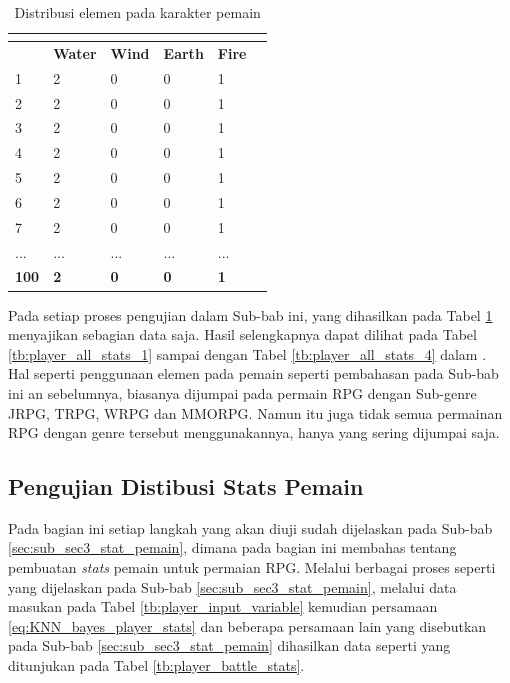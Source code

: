 \begin{longtable}{|l|l|l|l|l|l|}
	\caption{Distribusi elemen pada karakter pemain}
	\vspace{1ex}
	\label{tb:player_element}\\
	\hline
	\rowcolor[HTML]{C0C0C0} 
	\multicolumn{1}{|c|}{\cellcolor[HTML]{C0C0C0}\textbf{Levels}} & \multicolumn{1}{c|}{\cellcolor[HTML]{C0C0C0}\textbf{Water}} & \multicolumn{1}{c|}{\cellcolor[HTML]{C0C0C0}\textbf{Wind}} & \multicolumn{1}{c|}{\cellcolor[HTML]{C0C0C0}\textbf{Earth}} & \multicolumn{1}{c|}{\cellcolor[HTML]{C0C0C0}\textbf{Fire}} \\ \hline
	1 & 2 & 0 & 0 & 1 \\ \hline
	2 & 2 & 0 & 0 & 1 \\ \hline
	3 & 2 & 0 & 0 & 1 \\ \hline
	4 & 2 & 0 & 0 & 1 \\ \hline
	5 & 2 & 0 & 0 & 1 \\ \hline
	6 & 2 & 0 & 0 & 1 \\ \hline
	7 & 2 & 0 & 0 & 1 \\ \hline
	... & ... & ... & ... & ... \\ \hline
	\textbf{100} & \textbf{2} & \textbf{0} & \textbf{0} & \textbf{1} \\ \hline
\end{longtable}

Pada setiap proses pengujian dalam Sub-bab ini, yang dihasilkan pada Tabel \ref{tb:player_element} menyajikan sebagian data saja. Hasil selengkapnya dapat dilihat pada Tabel \ref{tb:player_all_stats_1} sampai dengan Tabel \ref{tb:player_all_stats_4} dalam . Hal seperti penggunaan elemen pada pemain seperti pembahasan pada Sub-bab ini an sebelumnya, biasanya dijumpai pada permain RPG dengan Sub-genre JRPG, TRPG, WRPG dan MMORPG. Namun itu juga tidak semua permainan RPG dengan genre tersebut menggunakannya, hanya yang sering dijumpai saja.
\vspace{1ex}

\subsection{Pengujian Distibusi Stats Pemain}
\label{sec:sub_sec4_eval_single-character_stats}
\vspace{1ex}

Pada bagian ini setiap langkah yang akan diuji sudah dijelaskan pada Sub-bab \ref{sec:sub_sec3_stat_pemain}, dimana pada bagian ini membahas tentang pembuatan \textit{stats} pemain untuk permaian RPG. Melalui berbagai proses seperti yang dijelaskan pada Sub-bab \ref{sec:sub_sec3_stat_pemain}, melalui data masukan pada Tabel \ref{tb:player_input_variable} kemudian persamaan \ref{eq:KNN_bayes_player_stats} dan beberapa persamaan lain yang disebutkan pada Sub-bab \ref{sec:sub_sec3_stat_pemain} dihasilkan data seperti yang ditunjukan pada Tabel \ref{tb:player_battle_stats}.
\vspace{-1ex}

